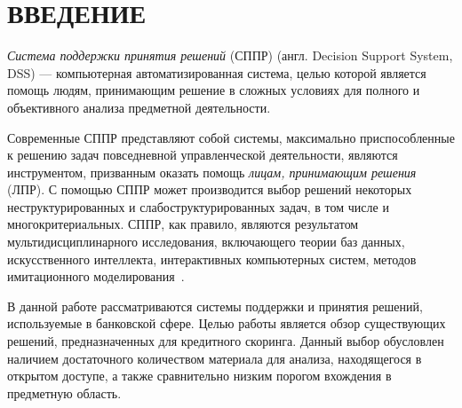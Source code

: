 \section*{ВВЕДЕНИЕ}

\emph{Система поддержки принятия решений} (СППР) (англ. Decision Support System, DSS) ---
компьютерная автоматизированная система, целью которой является помощь людям, принимающим
решение в сложных условиях для полного и объективного анализа предметной деятельности.

Современные СППР представляют собой системы, максимально приспособленные к решению
задач повседневной управленческой деятельности, являются инструментом, призванным
оказать помощь \emph{лицам, принимающим решения} (ЛПР).
С помощью СППР может производится выбор решений некоторых неструктурированных и
слабоструктурированных задач, в том числе и многокритериальных.
СППР, как правило, являются результатом мультидисциплинарного исследования,
включающего теории баз данных, искусственного интеллекта, интерактивных
компьютерных систем, методов имитационного моделирования~\cite{popov2008}.

В данной работе рассматриваются системы поддержки и принятия решений,
используемые в банковской сфере.
Целью работы является обзор существующих решений,
предназначенных для кредитного скоринга.
Данный выбор обусловлен наличием достаточного количеством материала для анализа,
находящегося в открытом доступе, а также сравнительно низким порогом вхождения
в предметную область.
